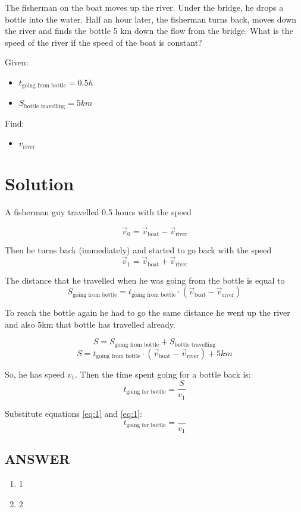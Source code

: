 The fisherman on the boat moves up the river. Under the bridge, he drops a bottle into the water.
Half an hour later, the fisherman turns back, moves down the river and finds the bottle 5 km
down the flow from the bridge. What is the speed of the river if the speed of the boat is constant?

\bigbreak Given: \begin{itemize}
    \item $t_{\text{going from bottle}} = 0.5h$
    \item $S_{\text{bottle travelling}} = 5km$
\end{itemize}

Find: \begin{itemize}
    \item $v_{\text{river}}$
\end{itemize}

\section*{Solution}

A fisherman guy travelled 0.5 hours with the speed

$$\Vec{v}_0 = \Vec{v}_{\text{boat}} - \Vec{v}_{\text{river}}$$

Then he turns back (immediately) and started to go back with the speed
\begin{equation}
    \label{eq:1}
    \Vec{v}_1 = \Vec{v}_{\text{boat}} + \Vec{v}_{\text{river}}
\end{equation}

The distance that he travelled when he was going from the bottle is equal to
$$S_{\text{going from bottle}} = t_{\text{going from bottle}} \cdot (\Vec{v}_{\text{boat}} - \Vec{v}_{\text{river}})$$

To reach the bottle again he had to go the same distance he went up the river and also 5km that bottle has travelled already.

$$S = S_{\text{going from bottle}} + S_{\text{bottle travelling}}$$
\begin{equation}
    \label{eq:2}
    S = t_{\text{going from bottle}} \cdot (\Vec{v}_{\text{boat}} - \Vec{v}_{\text{river}}) + 5km
\end{equation}

So, he has speed $v_1$. Then the time spent going for a bottle back is:
$$t_{\text{going for bottle}} = \frac{S}{v_1}$$

Substitute equations \eqref{eq:1} and \eqref{eq:1}:
$$t_{\text{going for bottle}} = \frac{}{v_1}$$



\vfill
\subsection*{ANSWER}
\begin{enumerate}
    \item 1
    \item 2
\end{enumerate}

